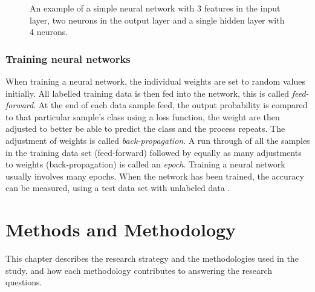 \documentclass[12pt, a4paper, onecolumn]{article}
\begin{document}
	\begin{figure}[H]
		\centering
		\caption{An example of a simple neural network with 3 features in the input layer, two neurons in the output layer and a single hidden layer with 4 neurons.}%
		\label{fig:neural-network-overview}%
	\end{figure} 
	
	\subsubsection{Training neural networks}
	When training a neural network, the individual weights are set to random values initially. All labelled training data is then fed into the network, this is called \textit{feed-forward}. At the end of each data sample feed, the output probability is compared to that particular sample's class using a loss function, the weight are then adjusted to better be able to predict the class and the process repeats. The adjustment of weights is called \textit{back-propagation}. A run through of all the samples in the training data set (feed-forward) followed by equally as many adjustments to weights (back-propagation) is called an \textit{epoch}. Training a neural network usually involves many epochs. When the network has been trained, the accuracy can be measured, using a test data set with unlabeled data \cite{neural_networks}.
	
	
	\newpage
	\section{Methods and Methodology}
	
	This chapter describes the research strategy and the methodologies used in the study, and how each methodology contributes to answering the research questions.
	
\end{document}
